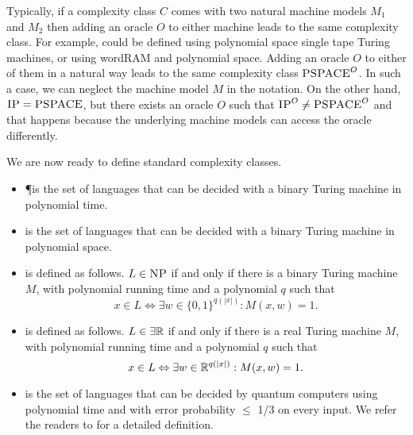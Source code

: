 \documentclass{article}
\begin{document}
Typically, if a complexity class $C$ comes with two natural machine models $M_1$ and $M_2$ then adding an oracle $O$ to either machine leads to the same complexity class. For example, \PSPACE could be defined using polynomial space single tape Turing machines, or using wordRAM and polynomial space.
Adding an oracle $O$ to either of them in a natural way leads to the same complexity class $\textsc{PSPACE}^{O}$.
In such a case, we can neglect the machine model $M$ in the notation. On the other hand,  $\textsc{IP} = \textsc{PSPACE}$, but there exists an oracle $O$ such that $\textsc{IP}^O \neq \textsc{PSPACE}^O$ and that happens because the underlying machine models can access the oracle differently. 

We are now ready to define standard complexity classes.

\begin{itemize}
    \item \P is the set of languages that can be decided with a binary Turing machine in polynomial time.
    \item \PSPACE is the set of languages that can be decided with a binary Turing machine in polynomial space.
    \item \NP is defined as follows. 
    $L\in \textsc{NP}$ if and only if there is a binary Turing machine $M$, with polynomial running time and a polynomial $q$ such that
        \[x \in L \Leftrightarrow \exists w\in \{0,1\}^{q(|x|)} : M(x,w) = 1.\]    
    \item \ER is defined as follows. 
    $L\in \exists\mathbb{R}$ if and only if there is a real Turing machine $M$, with polynomial running time and a polynomial $q$ such that
        \[x \in L \Leftrightarrow \exists w\in \mathbb{R}^{q(|x|)} : M(x,w) = 1.\]
    \item \BQP is the set of languages that can be decided by quantum computers using polynomial time and with error probability $\leq$ 1/3 on every input. We refer the readers to \cite[Definition~10.9]{AB09} for a detailed definition.
\end{itemize}
\end{document}
